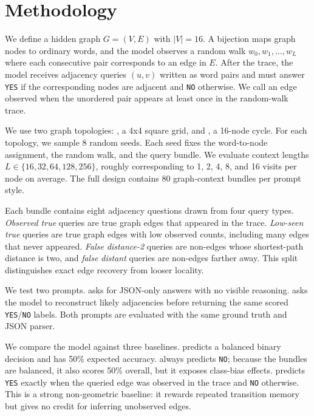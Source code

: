 \section{Methodology}
\label{sec:methodology}

We define a hidden graph $G=(V,E)$ with $|V|=16$. A bijection maps graph nodes to ordinary words, and the model observes a random walk $w_0,w_1,\ldots,w_L$ where each consecutive pair corresponds to an edge in $E$. After the trace, the model receives adjacency queries $(u,v)$ written as word pairs and must answer \texttt{YES} if the corresponding nodes are adjacent and \texttt{NO} otherwise. We call an edge observed when the unordered pair appears at least once in the random-walk trace.

We use two graph topologies: \gridgraph, a 4x4 square grid, and \ringgraph, a 16-node cycle. For each topology, we sample 8 random seeds. Each seed fixes the word-to-node assignment, the random walk, and the query bundle. We evaluate context lengths $L \in \{16,32,64,128,256\}$, roughly corresponding to 1, 2, 4, 8, and 16 visits per node on average. The full design contains 80 graph-context bundles per prompt style.

Each bundle contains eight adjacency questions drawn from four query types. \emph{Observed true} queries are true graph edges that appeared in the trace. \emph{Low-seen true} queries are true graph edges with low observed counts, including many edges that never appeared. \emph{False distance-2} queries are non-edges whose shortest-path distance is two, and \emph{false distant} queries are non-edges farther away. This split distinguishes exact edge recovery from looser locality.

We test two prompts. \directprompt asks for JSON-only answers with no visible reasoning. \reasonprompt asks the model to reconstruct likely adjacencies before returning the same scored \texttt{YES}/\texttt{NO} labels. Both prompts are evaluated with the same ground truth and JSON parser.

We compare the model against three baselines. \randombase predicts a balanced binary decision and has 50\% expected accuracy. \alwaysnobase always predicts \texttt{NO}; because the bundles are balanced, it also scores 50\% overall, but it exposes class-bias effects. \observedbaseline predicts \texttt{YES} exactly when the queried edge was observed in the trace and \texttt{NO} otherwise. This is a strong non-geometric baseline: it rewards repeated transition memory but gives no credit for inferring unobserved edges.

